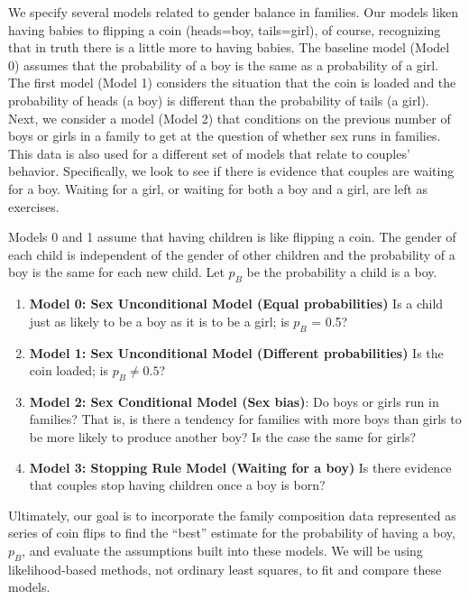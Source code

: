 \documentclass[
]{krantz}
\providecommand{\tightlist}{%
  \setlength{\itemsep}{0pt}\setlength{\parskip}{0pt}}
\begin{document}
We specify several models related to gender balance in families. Our models liken having babies to flipping a coin (heads=boy, tails=girl), of course, recognizing that in truth there is a little more to having babies. The baseline model (Model 0) assumes that the probability of a boy is the same as a probability of a girl. The first model (Model 1) considers the situation that the coin is loaded and the probability of heads (a boy) is different than the probability of tails (a girl). Next, we consider a model (Model 2) that conditions on the previous number of boys or girls in a family to get at the question of whether sex runs in families. This data is also used for a different set of models that relate to couples' behavior. Specifically, we look to see if there is evidence that couples are waiting for a boy. Waiting for a girl, or waiting for both a boy and a girl, are left as exercises.

Models 0 and 1 assume that having children is like flipping a coin. The gender of each child is independent of the gender of other children and the probability of a boy is the same for each new child. Let \(p_B\) be the probability a child is a boy.

\begin{enumerate}
\def\labelenumi{\arabic{enumi}.}
\tightlist
\item
  \textbf{Model 0: Sex Unconditional Model (Equal probabilities)} Is a child just as likely to be a boy as it is to be a girl; is \(p_B\) = 0.5?
\item
  \textbf{Model 1: Sex Unconditional Model (Different probabilities)} Is the coin loaded; is \(p_B \neq 0.5\)?
\item
  \textbf{Model 2: Sex Conditional Model (Sex bias)}: Do boys or girls run in families? That is,
  is there a tendency for families with more boys than girls to be more likely to produce another boy? Is the case the same for girls?\\
\item
  \textbf{Model 3: Stopping Rule Model (Waiting for a boy)}
  Is there evidence that couples stop having children once a boy is born?
\end{enumerate}

Ultimately, our goal is to incorporate the family composition data represented as series of coin flips to find the ``best'' estimate for the probability of having a boy, \(p_B\), and evaluate the assumptions built into these models. We will be using likelihood-based methods, not ordinary least squares, to fit and compare these models.
\end{document}

